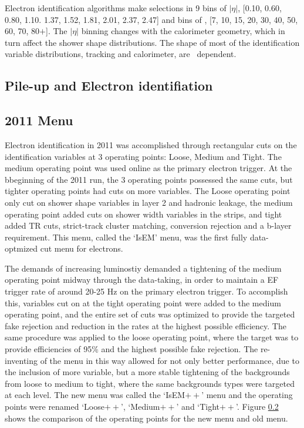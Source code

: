 Electron identification algorithms make selections in 9 bins of $|\eta|$, [0.10, 0.60, 0.80, 1.10. 1.37, 1.52, 1.81, 2.01, 2.37, 2.47] and bins of \pt, [7, 10, 15, 20, 30, 40, 50, 60, 70, 80$+$]. The $|\eta|$ binning changes with the calorimeter geometry, which in turn affect the shower shape distributions. The shape of most of the identification variable distributions, tracking and calorimeter, are \pt\ dependent.  


\begin{figure}

\end{figure}

\subsection{Pile-up and Electron identifiation}

\subsection{2011 Menu}

Electron identification in 2011 was accomplished through rectangular cuts on the identification variables at 3 operating points: Loose, Medium and Tight. The medium operating point was used online as the primary electron trigger. At the bbeginning of the 2011 run, the 3 operating points possessed the same cuts, but tighter operating points had cuts on more variables. The Loose operating point only cut on shower shape variables in layer 2 and hadronic leakage, the medium operating point added cuts on shower width variables in the strips, and tight added TR cuts, strict-track cluster matching, conversion rejection and a b-layer requirement. This menu, called the `IsEM' menu, was the first fully data-optmized cut menu for electrons. 

The demands of increasing luminostiy demanded a tightening of the medium operating point midway through the data-taking, in order to maintain a EF trigger rate of around 20-25 Hz on the primary electron trigger. To accomplish this, variables cut on at the tight operating point were added to the medium operating point, and the entire set of cuts was optimized to provide the targeted fake rejection and reduction in the rates at the highest possible efficiency. The same procedure was applied to the loose operating point, where the target was to provide efficiencies of 95\% and the highest possible fake rejection. The re-inventing of the menu in this way allowed for not only better performance, due to the inclusion of more variable, but a more stable tightening of the backgrounds from loose to medium to tight, where the same backgrounds types were targeted at each level. The new menu was called the `IsEM$++$' menu and the operating points were renamed `Loose$++$', `Medium$++$' and `Tight$++$'. Figure \ref{} shows the comparison of the operating points for the new menu and old menu.

